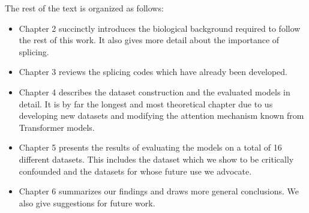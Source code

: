 The rest of the text is organized as follows:
\begin{itemize}
	\item Chapter 2 succinctly introduces the biological background required to follow the rest of this work. It also gives more detail about the importance of splicing.
	\item Chapter 3 reviews the splicing codes which have already been developed.
	\item Chapter 4 describes the dataset construction and the evaluated models in detail. It is by far the longest and most theoretical chapter due to us developing new datasets and modifying the attention mechanism known from Transformer models.
	\item Chapter 5 presents the results of evaluating the models on a total of 16 different datasets. This includes the dataset which we show to be critically confounded and the datasets for whose future use we advocate.
	\item Chapter 6 summarizes our findings and draws more general conclusions. We also give suggestions for future work.
\end{itemize}

